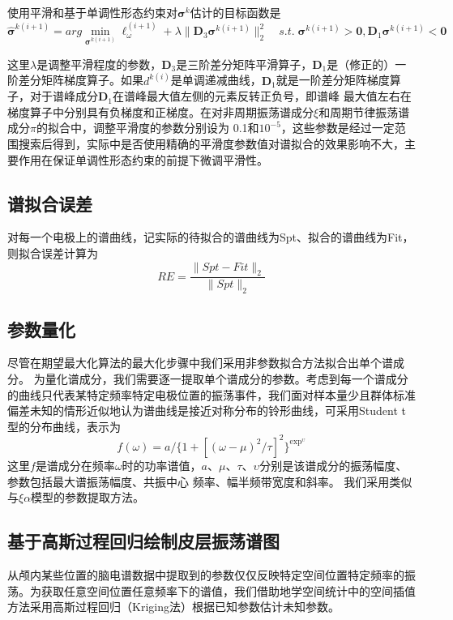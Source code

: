 使用平滑和基于单调性形态约束对$\mathbf{\sigma}^k$估计的目标函数是
\begin{equation}\label{eq7.12}
\hat{\mathbf{\sigma}}^{k(i+1)}=arg\min_{\mathbf{\sigma}^{k(i+1)}}\ell_\omega^{(i+1)}+\lambda\lVert\mathbf{D}_3\mathbf{\sigma}^{k(i+1)}\rVert_2^2\quad
s.t.\;\mathbf{\sigma}^{k(i+1)}>\mathbf{0},\mathbf{D}_1\mathbf{\sigma}^{k(i+1)}<\mathbf{0}
\end{equation}

这里$\lambda$是调整平滑程度的参数，$\mathbf{D}_3$是三阶差分矩阵平滑算子，$\mathbf{D}_1$是（修正的）一阶差分矩阵梯度算子。如果$d^{k(i)}$是单调递减曲线，$\mathbf{D}_1$就是一阶差分矩阵梯度算子，对于谱峰成分$\mathbf{D}_1$在谱峰最大值左侧的元素反转正负号，即谱峰
最大值左右在梯度算子中分别具有负梯度和正梯度。在对非周期振荡谱成分$\xi$和周期节律振荡谱成分$\pi$的拟合中，调整平滑度的参数分别设为
0.1和$10^{-5}$，这些参数是经过一定范围搜索后得到，实际中是否使用精确的平滑度参数值对谱拟合的效果影响不大，主要作用在保证单调性形态约束的前提下微调平滑性。

\subsection{谱拟合误差}
对每一个电极上的谱曲线，记实际的待拟合的谱曲线为Spt、拟合的谱曲线为Fit，则拟合误差计算为
\begin{equation}\label{eq7.13}
RE = \frac{\lVert{Spt-Fit}\rVert_2}{\lVert{Spt}\rVert_2}
\end{equation}

\subsection{参数量化}
尽管在期望最大化算法的最大化步骤中我们采用非参数拟合方法拟合出单个谱成分。 为量化谱成分，我们需要逐一提取单个谱成分的参数。考虑到每一个谱成分的曲线只代表某特定频率特定电极位置的振荡事件，我们面对样本量少且群体标准偏差未知的情形近似地认为谱曲线是接近对称分布的铃形曲线，可采用Student t型的分布曲线，表示为
\begin{equation}\label{eq7.14}
f(\omega)=a/\lbrace1+[(\omega-\mu)^2/\tau]^2\rbrace^{\exp^\upsilon}
\end{equation}
这里$f$是谱成分在频率$\omega$时的功率谱值，$a$、$\mu$、$\tau$、$\upsilon$分别是该谱成分的振荡幅度、参数包括最大谱振荡幅度、共振中心
频率、幅半频带宽度和斜率。 我们采用类似与$\xi\alpha$模型的参数提取方法。

\subsection{基于高斯过程回归绘制皮层振荡谱图}\label{ch:kriging}
从颅内某些位置的脑电谱数据中提取到的参数仅仅反映特定空间位置特定频率的振荡。为获取任意空间位置任意频率下的谱值，我们借助地学空间统计中的空间插值方法采用高斯过程回归（Kriging法）根据已知参数估计未知参数。

